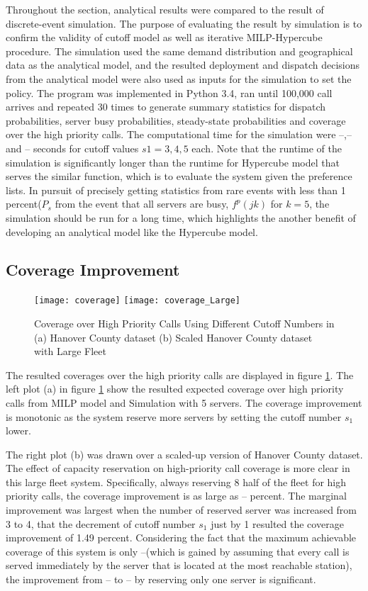 \documentclass{article}
\begin{document}
Throughout the section, analytical results were compared to the result of discrete-event simulation. The purpose of evaluating the result by simulation is to confirm the validity of cutoff model as well as iterative MILP-Hypercube procedure. The simulation used the same demand distribution and geographical data as the analytical model, and the resulted deployment and dispatch decisions from the analytical model were also used as inputs for the simulation to set the policy. The program was implemented in Python 3.4, ran until 100,000 call arrives and repeated 30 times to generate summary statistics for dispatch probabilities, server busy probabilities, steady-state probabilities and coverage over the high priority calls. The computational time for the simulation were --,-- and -- seconds for cutoff values $s1=3,4,5$ each. Note that the runtime of the simulation is significantly longer than the runtime for Hypercube model that serves the similar function, which is to evaluate the system given the preference lists. In pursuit of precisely getting statistics from rare events with less than 1 percent($P_s$ from the event that all servers are busy, $f^p(jk)$ for $k=5$, the simulation should be run for a long time, which highlights the another benefit of developing an analytical model like the Hypercube model.




\subsection{Coverage Improvement}

\begin{figure}
\centering
\texttt{[image: coverage]} 
\texttt{[image: coverage\_Large]}
\caption{Coverage over High Priority Calls Using Different Cutoff Numbers in (a) Hanover County dataset (b) Scaled Hanover County dataset with Large Fleet}
\label{fig:coverage}
\end{figure}

The resulted coverages over the high priority calls are displayed in figure \ref{fig:coverage}. The left plot (a) in figure \ref{fig:coverage} show the resulted expected coverage over high priority calls from MILP model and Simulation with 5 servers. The coverage improvement is monotonic as the system reserve more servers by setting the cutoff number $s_1$ lower. 
 
The right plot (b) was drawn over a scaled-up version of Hanover County dataset. The effect of capacity reservation on high-priority call coverage is more clear in this large fleet system. Specifically, always reserving 8 half of the fleet for high priority calls, the coverage improvement is as large as -- percent. The marginal improvement was largest when the number of reserved server was increased from 3 to 4, that the decrement of cutoff number $s_1$ just by 1 resulted the coverage improvement of 1.49 percent. Considering the fact that the maximum achievable coverage of this system is only --(which is gained by assuming that every call is served immediately by the server that is located at the most reachable station), the improvement from -- to -- by reserving only one server is significant.
\end{document}

